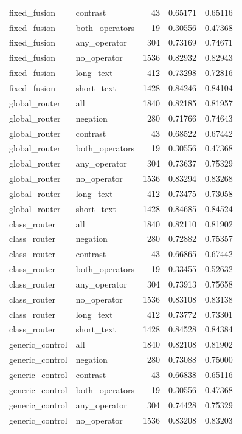 \begin{tabular}{llrrr}
fixed_fusion & contrast & 43 & 0.65171 & 0.65116 \\
fixed_fusion & both_operators & 19 & 0.30556 & 0.47368 \\
fixed_fusion & any_operator & 304 & 0.73169 & 0.74671 \\
fixed_fusion & no_operator & 1536 & 0.82932 & 0.82943 \\
fixed_fusion & long_text & 412 & 0.73298 & 0.72816 \\
fixed_fusion & short_text & 1428 & 0.84246 & 0.84104 \\
global_router & all & 1840 & 0.82185 & 0.81957 \\
global_router & negation & 280 & 0.71766 & 0.74643 \\
global_router & contrast & 43 & 0.68522 & 0.67442 \\
global_router & both_operators & 19 & 0.30556 & 0.47368 \\
global_router & any_operator & 304 & 0.73637 & 0.75329 \\
global_router & no_operator & 1536 & 0.83294 & 0.83268 \\
global_router & long_text & 412 & 0.73475 & 0.73058 \\
global_router & short_text & 1428 & 0.84685 & 0.84524 \\
class_router & all & 1840 & 0.82110 & 0.81902 \\
class_router & negation & 280 & 0.72882 & 0.75357 \\
class_router & contrast & 43 & 0.66865 & 0.67442 \\
class_router & both_operators & 19 & 0.33455 & 0.52632 \\
class_router & any_operator & 304 & 0.73913 & 0.75658 \\
class_router & no_operator & 1536 & 0.83108 & 0.83138 \\
class_router & long_text & 412 & 0.73772 & 0.73301 \\
class_router & short_text & 1428 & 0.84528 & 0.84384 \\
generic_control & all & 1840 & 0.82108 & 0.81902 \\
generic_control & negation & 280 & 0.73088 & 0.75000 \\
generic_control & contrast & 43 & 0.66838 & 0.65116 \\
generic_control & both_operators & 19 & 0.30556 & 0.47368 \\
generic_control & any_operator & 304 & 0.74428 & 0.75329 \\
generic_control & no_operator & 1536 & 0.83208 & 0.83203 \\

\end{tabular}
